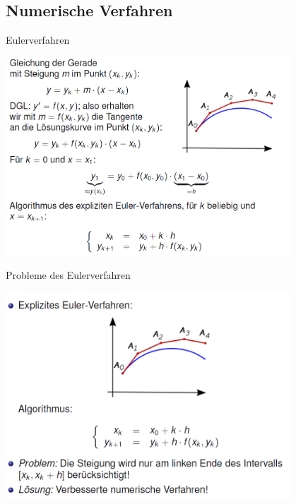 \subsection{Numerische Verfahren}
\begin{definition}{Eulerverfahren}
  \begin{center}
  \includegraphics[width=0.8\textwidth]{images/2024-06-02-22-23-19.png}
  \end{center}
\end{definition}
\begin{definition}{Probleme des Eulerverfahren}
  \begin{center}
  \includegraphics[width=0.8\textwidth]{images/2024-06-02-22-24-08.png}
  \end{center}
\end{definition}
